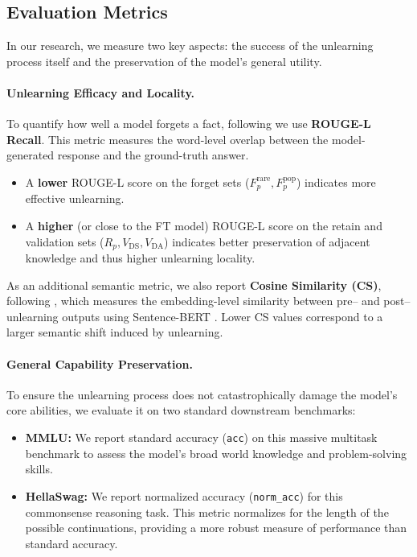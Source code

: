 \documentclass[11pt]{article}
\begin{document}
{ \subsection{Evaluation Metrics}
\label{sec:evaluation}

In our research, we measure two key aspects: the success of the unlearning process itself and the preservation of the model's general utility.

\paragraph{Unlearning Efficacy and Locality.}
To quantify how well a model forgets a fact, following \cite{lin2004rouge, geng2025comprehensive} we use \textbf{ROUGE-L Recall}. This metric measures the word-level overlap between the model-generated response and the ground-truth answer.
\begin{itemize}
    \item A \textbf{lower} ROUGE-L score on the forget sets ($F_p^{\text{rare}}, F_p^{\text{pop}}$) indicates more effective unlearning.
    \item A \textbf{higher} (or close to the FT model) ROUGE-L score on the retain and validation sets ($R_p, V_{\text{DS}}, V_{\text{DA}}$) indicates better preservation of adjacent knowledge and thus higher unlearning locality.
\end{itemize}

As an additional semantic metric, we also report \textbf{Cosine Similarity (CS)}, following \cite{yuan2024closer}, which measures the embedding-level similarity between pre– and post–unlearning outputs using Sentence-BERT \cite{reimers2019sentence}. Lower CS values correspond to a larger semantic shift induced by unlearning.

\paragraph{General Capability Preservation.}
To ensure the unlearning process does not catastrophically damage the model's core abilities, we evaluate it on two standard downstream benchmarks:
\begin{itemize}
    \item \textbf{MMLU:} We report standard accuracy (\texttt{acc}) on this massive multitask benchmark to assess the model's broad world knowledge and problem-solving skills.
    \item \textbf{HellaSwag:} We report normalized accuracy (\texttt{norm\_acc}) for this commonsense reasoning task. This metric normalizes for the length of the possible continuations, providing a more robust measure of performance than standard accuracy.
\end{itemize}


}
\end{document}
